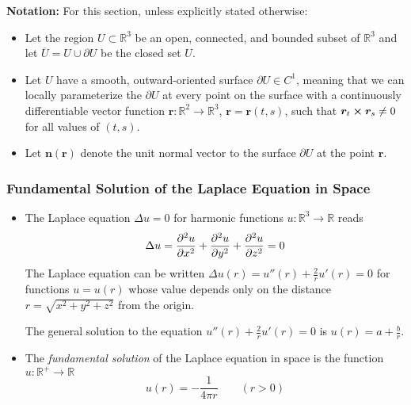 \documentclass[11pt, a4paper]{article}
\newcommand{\R}{\mathbb{R}} %
\begin{document}
\textbf{Notation:} For this section, unless explicitly stated otherwise:
\begin{itemize}
	\item Let the region $ U \subset \R^3 $ be an open, connected, and bounded subset of $ \R^3 $ and let $ \overline{U} = U \cup \partial U $ be the closed set $ U $. 
	\item Let $ U $ have a smooth, outward-oriented surface $ \partial U \in C^1 $, meaning that we can locally parameterize the $ \partial U $ at every point on the surface with a continuously differentiable vector function $ \bm{r}: \R^2 \to \R^3 $, $ \bm{r} = \bm{r}(t, s) $, such that $ \bm{r}_{t} \cross \bm{r}_s \neq 0 $ for all values of $ (t, s) $.
	\item Let $ \bm{n}(\bm{r}) $ denote the unit normal vector to the surface $ \partial U $ at the point $ \bm{r} $.
\end{itemize}


\subsubsection{Fundamental Solution of the Laplace Equation in Space}
\begin{itemize}
	\item The Laplace equation $ \Delta u = 0 $ for harmonic functions $ u : \R^3 \to \R $ reads
	\begin{equation*}
		\Delta u = \pdv[2]{u}{x} + \pdv[2]{u}{y} + \pdv[2]{u}{z} = 0
	\end{equation*}
	The Laplace equation can be written $ \Delta u(r) = u''(r) + \frac{2}{r}u'(r) = 0 $	for functions $ u = u(r) $ whose value depends only on the distance $ r = \sqrt{x^{2} + y^{2} + z^{2}} $ from the origin. 
	
	The general solution to the equation $ u''(r) + \frac{2}{r}u'(r) = 0 $ is $ u(r) = a + \frac{b}{r}$.
	
	
	\item The \textit{fundamental solution} of the Laplace equation in space is the function $ u : \R^+ \to \R $ 
	\begin{equation*}
		u(r) = -\frac{1}{4\pi r} \qquad (r > 0)
	\end{equation*}

\end{itemize}
\end{document}
